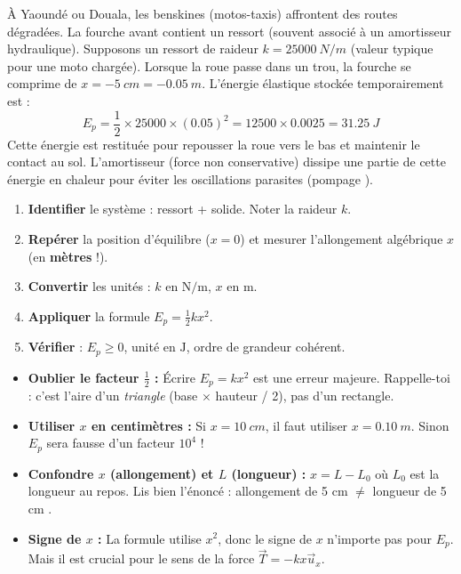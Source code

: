 \documentclass[11pt]{article}
\newcommand{\cle}[1]{{\popxbold\color{popdark}#1}}
\begin{document}
\begin{exemplebox}
À Yaoundé ou Douala, les \cle{benskines} (motos-taxis) affrontent des routes dégradées. La fourche avant contient un ressort (souvent associé à un amortisseur hydraulique). Supposons un ressort de raideur $k = \SI{25000}{N/m}$ (valeur typique pour une moto chargée). Lorsque la roue passe dans un trou, la fourche se comprime de $x = -\SI{5}{cm} = \SI{-0,05}{m}$.
L'énergie élastique stockée temporairement est :
\[
E_p = \frac{1}{2} \times \num{25000} \times (\num{0,05})^2 = \num{12500} \times \num{0,0025} = \SI{31,25}{J}
\]
Cette énergie est restituée pour repousser la roue vers le bas et maintenir le contact au sol. L'amortisseur (force non conservative) dissipe une partie de cette énergie en chaleur pour éviter les oscillations parasites (\guillemotleft pompage \guillemotright).
\end{exemplebox}

\begin{methode}
\begin{enumerate}
    \item \textbf{Identifier} le système : ressort + solide. Noter la raideur $k$.
    \item \textbf{Repérer} la position d'équilibre ($x=0$) et mesurer l'allongement algébrique $x$ (en \textbf{mètres} !).
    \item \textbf{Convertir} les unités : $k$ en $\si{\newton\per\meter}$, $x$ en $\si{\meter}$.
    \item \textbf{Appliquer} la formule $E_p = \frac{1}{2} k x^2$.
    \item \textbf{Vérifier} : $E_p \ge 0$, unité en $\si{\joule}$, ordre de grandeur cohérent.
\end{enumerate}
\end{methode}

\begin{attention}
\begin{itemize}
    \item \textbf{Oublier le facteur $\frac{1}{2}$ :} Écrire $E_p = k x^2$ est une erreur majeure. Rappelle-toi : c'est l'aire d'un \emph{triangle} (base $\times$ hauteur / 2), pas d'un rectangle.
    \item \textbf{Utiliser $x$ en centimètres :} Si $x = \SI{10}{cm}$, il faut utiliser $x = \SI{0,10}{m}$. Sinon $E_p$ sera fausse d'un facteur $10^4$ !
    \item \textbf{Confondre $x$ (allongement) et $L$ (longueur) :} $x = L - L_0$ où $L_0$ est la longueur au repos. Lis bien l'énoncé : \guillemotleft allongement de 5 cm \guillemotright $\neq$ \guillemotleft longueur de 5 cm \guillemotright.
    \item \textbf{Signe de $x$ :} La formule utilise $x^2$, donc le signe de $x$ n'importe pas pour $E_p$. Mais il est crucial pour le sens de la force $\vec{T} = -kx\vec{u}_x$.
\end{itemize}
\end{attention}
\end{document}
